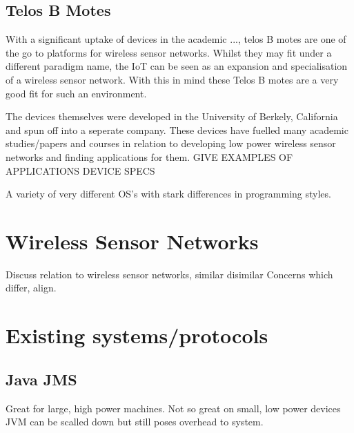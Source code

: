 \documentclass{l4proj}
\begin{document}
\subsection{Telos B Motes} %
\label{sub:telos_b_motes}

With a significant uptake of devices in the academic ..., telos B motes are one of the go to platforms for wireless sensor networks.
Whilst they may fit under a different paradigm name, the IoT can be seen as an expansion and specialisation of a wireless sensor network.
With this in mind these Telos B motes are a very good fit for such an environment. 

The devices themselves were developed in the University of Berkely, California and spun off into a seperate company. These devices have fuelled many academic studies/papers and courses in relation to developing low power wireless sensor networks and finding applications for them.
GIVE EXAMPLES OF APPLICATIONS
DEVICE SPECS

A variety of very different OS's with stark differences in programming styles.

\begin{comment}

Some research 
popular academic tool, many OS's, very low power like Arduino, with radio and sensors
some gpio, but limited
Contiki c like, event and thread driven
\end{comment}
\section{Wireless Sensor Networks} %
\label{sec:wireless_sensor_networks}
Discuss relation to wireless sensor networks, similar disimilar
Concerns which differ, align.


\section{Existing systems/protocols} %
\label{sec:existing_systems_protocols}

\subsection{Java JMS} %
\label{sub:java_jms}
Great for large, high power machines.
Not so great on small, low power devices
JVM can be scalled down but still poses overhead to system.
\end{document}
